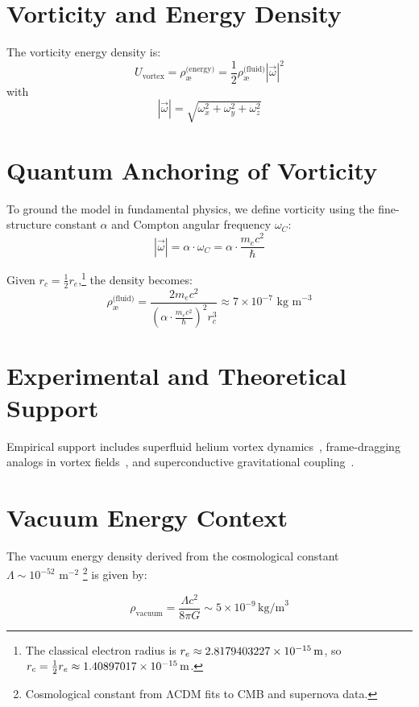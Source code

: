 \documentclass[12pt]{article}
\begin{document}
    \section{Vorticity and Energy Density}

    The vorticity energy density is:
    \[
        U_{\text{vortex}} = \rho_{\text{\ae}}^{\text{(energy)}} = \frac{1}{2} \rho_{\text{\ae}}^{\text{(fluid)}} |\vec{\omega}|^2
    \]
    with
    \[
        |\vec{\omega}| = \sqrt{\omega_x^2 + \omega_y^2 + \omega_z^2}
    \]

    \section{Quantum Anchoring of Vorticity}

    To ground the model in fundamental physics, we define vorticity using the fine-structure constant $\alpha$ and Compton angular frequency $\omega_C$:
    \[
        |\vec{\omega}| = \alpha \cdot \omega_C = \alpha \cdot \frac{m_e c^2}{\hbar}
    \]

    Given $r_c = \frac{1}{2} r_e$,\footnote{The classical electron radius is \( r_e \approx 2.8179403227 \times 10^{-15} \, \text{m} \), so \( r_c = \frac{1}{2} r_e \approx 1.40897017 \times 10^{-15} \, \text{m} \).} the density becomes:
    \[
        \rho_{\text{\ae}}^{\text{(fluid)}} = \frac{2 m_e c^2}{\left(\alpha \cdot \frac{m_e c^2}{\hbar}\right)^2 r_c^3} \approx 7 \times 10^{-7} \text{ kg m}^{-3}
    \]

    \section{Experimental and Theoretical Support}

    Empirical support includes superfluid helium vortex dynamics~\cite{jackson2021}, frame-dragging analogs in vortex fields~\cite{paris2015}, and superconductive gravitational coupling~\cite{santiago2011}.

    \section{Vacuum Energy Context}

    The vacuum energy density derived from the cosmological constant \( \Lambda \sim 10^{-52} \text{ m}^{-2} \)
\footnote{Cosmological constant from ΛCDM fits to CMB and supernova data.} is given by:

    \[
        \rho_{\text{vacuum}} = \frac{\Lambda c^2}{8 \pi G} \sim 5 \times 10^{-9} \, \text{kg/m}^3
    \]
\end{document}
